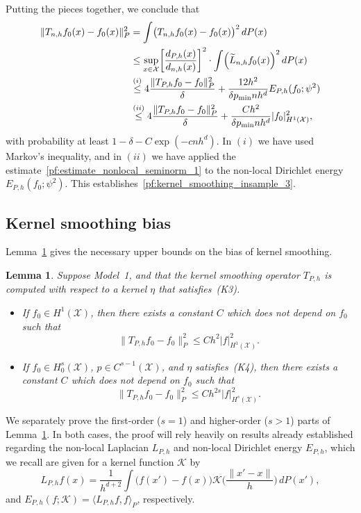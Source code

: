 \documentclass[aos]{imsart}
\theoremstyle{plain}
\newtheorem{lemma}{Lemma}
\theoremstyle{definition}
\theoremstyle{remark}
\newcommand{\dotp}[2]{\langle #1, #2 \rangle}
\newcommand{\wt}[1]{\widetilde{#1}}
\newcommand{\mc}[1]{\mathcal{#1}}
\newcommand{\1}{\mathbf{1}}
\begin{document}
Putting the pieces together, we conclude that
\begin{align*}
\|T_{n,h}f_0(x) - f_0(x)\|_P^2 & = \int \bigl(T_{n,h}f_0(x) - f_0(x)\bigr)^2 \,dP(x) \\
& \leq \sup_{x \in \mc{X}} \biggl[\frac{d_{P,h}(x)}{d_{n,h}(x)}\biggr]^2 \cdot \int \Bigl(\wt{L}_{n,h}f_0(x)\Bigr)^2 \,dP(x) \\
& \overset{(i)}{\leq} 4\frac{\| T_{P,h}f_0 - f_0\|_P^2}{\delta} + \frac{12h^2}{\delta p_{\min}nh^d} {E}_{P,h}(f_0;\psi^2) \\
& \overset{(ii)}{\leq}  4\frac{\| T_{P,h}f_0 - f_0\|_P^2}{\delta} + \frac{Ch^2}{\delta p_{\min}nh^d} |f_0|_{H^1(\mc{X})}^2,
\end{align*}
with probability at least $1 - \delta - C\exp(-cnh^d)$. In $(i)$ we have used Markov's inequality, and in $(ii)$ we have applied the estimate~\eqref{pf:estimate_nonlocal_seminorm_1} to the non-local Dirichlet energy ${E}_{P,h}(f_0;\psi^2)$. This establishes~\eqref{pf:kernel_smoothing_insample_3}.

\subsection{Kernel smoothing bias}
\label{subsec:pf_kernel_smoothing_bias}
Lemma~\ref{lem:kernel_smoothing_bias} gives the necessary upper bounds on the bias of kernel smoothing.
\begin{lemma}
	\label{lem:kernel_smoothing_bias}
	Suppose Model~1, and that the kernel smoothing operator $T_{P,h}$ is computed with respect to a kernel $\eta$ that satisfies~(K3).
	\begin{itemize}
		\item If $f_0 \in H^1(\mc{X})$, then there exists a constant $C$ which does not depend on $f_0$ such that
		\begin{equation*}
		\|T_{P,h}f_0 - f_0\|_P^2 \leq C h^{2} |f|_{H^1(\mc{X})}^2.
		\end{equation*}
		\item If $f_0 \in H_0^{s}(\mc{X})$, $p \in C^{s - 1}(\mc{X})$, and $\eta$ satisfies~(K4), then there exists a constant $C$ which does not depend on $f_0$ such that
		\begin{equation*}
		\|T_{P,h}f_0 - f_0\|_P^2 \leq C h^{2s} |f|_{H^s(\mc{X})}^2.
		\end{equation*}
	\end{itemize}
\end{lemma}
We separately prove the first-order ($s = 1$) and higher-order ($s > 1$) parts of Lemma~\ref{lem:kernel_smoothing_bias}. In both cases, the proof will rely heavily on results already established regarding the non-local Laplacian $L_{P,h}$ and non-local Dirichlet energy $E_{P,h}$, which we recall are given for a kernel function $\mc{K}$ by
\begin{equation*}
L_{P,h}f(x) = \frac{1}{h^{d + 2}} \int \bigl(f(x') - f(x)\bigr)\mc{K}\biggl(\frac{\|x' - x\|}{h}\biggr)\,dP(x'),
\end{equation*}
and $E_{P,h}(f;\mc{K}) = \dotp{L_{P,h}f}{f}_{P}$, respectively. 
\end{document}
